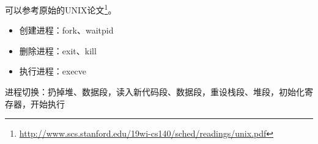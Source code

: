 可以参考原始的UNIX论文\footnote{\url{http://www.scs.stanford.edu/19wi-cs140/sched/readings/unix.pdf}}。
\begin{itemize}
	\item 创建进程：fork、waitpid
	\item 删除进程：exit、kill
	\item 执行进程：execve
\end{itemize}

进程切换：扔掉堆、数据段，读入新代码段、数据段，重设栈段、堆段，初始化寄存器，开始执行